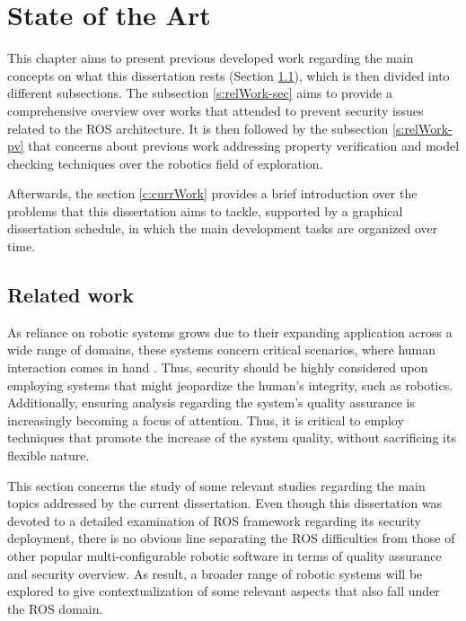 \chapter{State of the Art}\label{c:stateofArt}

This chapter aims to present previous developed work regarding the main concepts on what this dissertation rests (Section \ref{c:relWork}), which is then divided into different subsections. The subsection \ref{s:relWork-sec} aims to provide a comprehensive overview over works that attended to prevent security issues related to the ROS architecture. %
It is then followed by the subsection %
\ref{s:relWork-pv} that concerns about previous work addressing property verification and model checking techniques over the robotics field of exploration.

Afterwards, the section \ref{c:currWork} provides a brief introduction over the problems that this dissertation aims to tackle, supported by a graphical dissertation schedule, in which the main development tasks are organized over time.

\section{Related work}\label{c:relWork}

As reliance on robotic systems grows due to their expanding application across a wide range of domains, these systems concern critical scenarios, where human interaction comes in hand \cite{diluoffo2018robot}. Thus, security should be highly considered upon employing systems that might jeopardize the human's integrity, such as robotics. Additionally, ensuring analysis regarding the system's quality assurance is increasingly becoming a focus of attention. Thus, it is critical to employ techniques that promote the increase of the system quality, without sacrificing its flexible nature.

This section concerns the study of some relevant studies regarding the main topics addressed by the current dissertation. Even though this dissertation was devoted to a detailed examination of ROS framework regarding its security deployment, there is no obvious line separating the ROS difficulties from those of other popular multi-configurable robotic software in terms of quality assurance and security overview. As result, a broader range of robotic systems will be explored to give contextualization of some relevant aspects that also fall under the ROS domain.


